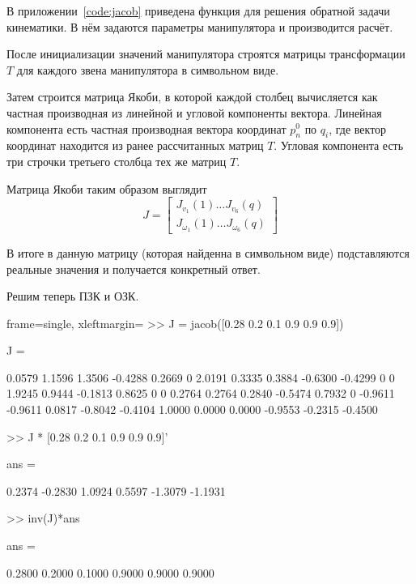 \documentclass[14pt]{extarticle}
\begin{document}
    В приложении~\ref{code:jacob} приведена функция для решения обратной задачи кинематики. В нём задаются параметры
    манипулятора и производится расчёт.

    После инициализации значений манипулятора строятся матрицы трансформации $T$ для каждого звена манипулятора в символьном виде.

    Затем строится матрица Якоби, в которой каждой столбец вычисляется как частная производная из линейной и угловой компоненты вектора.
    Линейная компонента есть частная производная вектора координат $p^0_n$ по $q_i$, где вектор координат находится из ранее
    рассчитанных матриц $T$. Угловая компонента есть три строчки третьего столбца тех же матриц $T$.

    Матрица Якоби таким образом выглядит
    \begin{equation}
        J =
        \begin{bmatrix}
            J_{v_1}(1) \dots J_{v_6}(q) \\
            J_{\omega_1}(1) \dots J_{\omega_6}(q)
        \end{bmatrix}
    \end{equation}

    В итоге в данную матрицу (которая найденна в символьном виде) подставляются реальные значения и получается
    конкретный ответ.

    Решим теперь ПЗК и ОЗК.
    \begin{matlabcode*}{frame=single, xleftmargin=\parindent}
        >> J = jacob([0.28 0.2 0.1 0.9 0.9 0.9])

        J =

            0.0579    1.1596    1.3506   -0.4288    0.2669         0
            2.0191    0.3335    0.3884   -0.6300   -0.4299         0
                 0    1.9245    0.9444   -0.1813    0.8625         0
                 0    0.2764    0.2764    0.2840   -0.5474    0.7932
                 0   -0.9611   -0.9611    0.0817   -0.8042   -0.4104
            1.0000    0.0000    0.0000   -0.9553   -0.2315   -0.4500

        >> J * [0.28 0.2 0.1 0.9 0.9 0.9]'

        ans =

            0.2374
           -0.2830
            1.0924
            0.5597
           -1.3079
           -1.1931

        >> inv(J)*ans

        ans =

            0.2800
            0.2000
            0.1000
            0.9000
            0.9000
            0.9000
    \end{matlabcode*}
\end{document}
